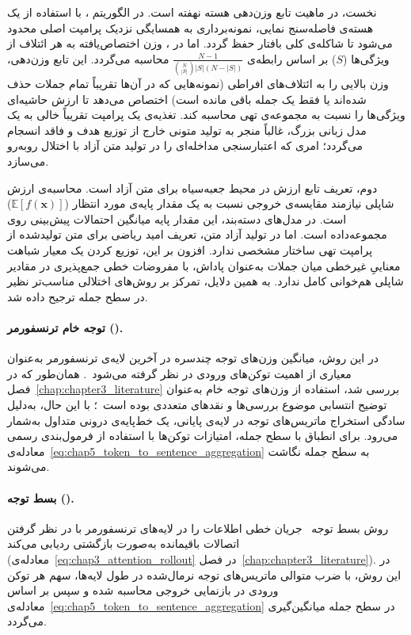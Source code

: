 نخست، در ماهیت تابع وزن‌دهی هسته نهفته است. در الگوریتم ، با استفاده از یک هسته‌ی فاصله‌سنج نمایی، نمونه‌برداری به همسایگی نزدیک پرامپت اصلی محدود می‌شود تا شاکله‌ی کلی بافتار حفظ گردد. اما در ، وزن اختصاص‌یافته به هر ائتلاف از ویژگی‌ها ($S$) بر اساس رابطه‌ی $\frac{N-1}{\binom{N}{|S|} |S| (N-|S|)}$ محاسبه می‌گردد. این تابع وزن‌دهی، وزن بالایی را به ائتلاف‌های افراطی (نمونه‌هایی که در آن‌ها تقریباً تمام جملات حذف شده‌اند یا فقط یک جمله باقی مانده است) اختصاص می‌دهد تا ارزش حاشیه‌ای ویژگی‌ها را نسبت به مجموعه‌ی تهی محاسبه کند. تغذیه‌ی یک پرامپت تقریباً خالی به یک مدل زبانی بزرگ، غالباً منجر به تولید متونی خارج از توزیع هدف و فاقد انسجام می‌گردد؛ امری که اعتبارسنجی مداخله‌ای را در تولید متن آزاد با اختلال روبه‌رو می‌سازد.

دوم، تعریف تابع ارزش در محیط جعبه‌سیاه برای متن آزاد است. محاسبه‌ی ارزش شاپلی نیازمند مقایسه‌ی خروجی نسبت به یک مقدار پایه‌ی مورد انتظار ($\mathbb{E}[f(\mathbf{x})]$) است. در مدل‌های دسته‌بند، این مقدار پایه میانگین احتمالات پیش‌بینی روی مجموعه‌داده است. اما در تولید آزاد متن، تعریف امید ریاضی برای متن تولیدشده از پرامپت تهی ساختار مشخصی ندارد. افزون بر این، توزیع کردن یک معیار شباهت معناییِ غیرخطی میان جملات به‌عنوان پاداش، با مفروضات خطی جمع‌پذیری در مقادیر شاپلی هم‌خوانی کامل ندارد. به همین دلایل، تمرکز بر روش‌های اختلالی مناسب‌تر نظیر  در سطح جمله ترجیح داده شد.

\paragraph{توجه خام ترنسفورمر ().}\label{par:chap5_raw_attention_baseline}
در این روش، میانگین وزن‌های توجه چندسره در آخرین لایه‌ی ترنسفورمر به‌عنوان معیاری از اهمیت توکن‌های ورودی در نظر گرفته می‌شود~\cite{bahdanau2014neural, vaswani2017attention}. همان‌طور که در فصل~\ref{chap:chapter3_literature} بررسی شد، استفاده از وزن‌های توجه خام به‌عنوان توضیح انتسابی موضوع بررسی‌ها و نقدهای متعددی بوده است~\cite{jain2019attention, wiegreffe2019attention}؛ با این حال، به‌دلیل سادگی استخراج ماتریس‌های توجه در لایه‌ی پایانی، یک خط‌پایه‌ی درونی متداول به‌شمار می‌رود. برای انطباق با سطح جمله، امتیازات توکن‌ها با استفاده از فرمول‌بندی رسمی معادله‌ی~\ref{eq:chap5_token_to_sentence_aggregation} به سطح جمله نگاشت می‌شوند.

\paragraph{بسط توجه ().}\label{par:chap5_attention_rollout_baseline}
روش بسط توجه~\cite{abnar2020quantifying} جریان خطی اطلاعات را در لایه‌های ترنسفورمر با در نظر گرفتن اتصالات باقیمانده به‌صورت بازگشتی ردیابی می‌کند (معادله‌ی~\ref{eq:chap3_attention_rollout} در فصل~\ref{chap:chapter3_literature}). در این روش، با ضرب متوالی ماتریس‌های توجه نرمال‌شده در طول لایه‌ها، سهم هر توکن ورودی در بازنمایی خروجی محاسبه شده و سپس بر اساس معادله‌ی~\ref{eq:chap5_token_to_sentence_aggregation} در سطح جمله میانگین‌گیری می‌گردد.

